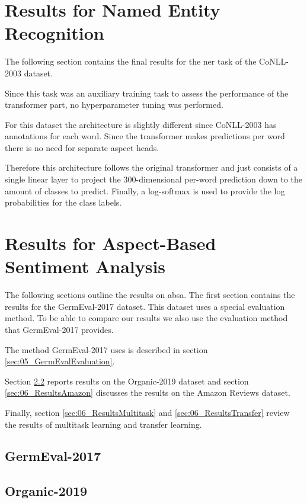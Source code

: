 \section{Results for Named Entity Recognition}

The following section contains the final results for the \acrfull{ner} task of the CoNLL-2003 dataset.

Since this task was an auxiliary training task to assess the performance of the transformer part, no hyperparameter tuning was performed.
\medskip

For this dataset the architecture is slightly different since CoNLL-2003 has annotations for each word. Since the transformer makes predictions per word there is no need for separate aspect heads.

Therefore this architecture follows the original transformer and just consists of a single linear layer to project the 300-dimensional per-word prediction down to the amount of classes to predict. Finally, a log-softmax is used to provide the log probabilities for the class labels.



\section{Results for Aspect-Based Sentiment Analysis}
The following sections outline the results on \acrfull{absa}. The first section contains the results for the GermEval-2017 dataset. This dataset uses a special evaluation method. To be able to compare our results we also use the evaluation method that GermEval-2017 provides.

The method GermEval-2017 uses is described in section \ref{sec:05_GermEvalEvaluation}.
\medskip

Section \ref{sec:06_ResultsOrganic} reports results on the Organic-2019 dataset and section \ref{sec:06_ResultsAmazon} discusses the results on the Amazon Reviews dataset.

Finally, section \ref{sec:06_ResultsMultitask} and \ref{sec:06_ResultsTransfer} review the results of multitask learning and transfer learning.

\subsection{GermEval-2017}
\label{sec:06_ResultsGermEval}

\subsection{Organic-2019}
\label{sec:06_ResultsOrganic}

